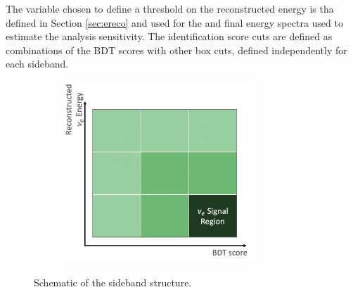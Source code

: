 The variable chosen to define a threshold on the reconstructed energy is tha defined in Section \ref{sec:ereco} and used for the \npsel and \zpsel final energy spectra used to estimate the analysis sensitivity.
The identification score cuts are defined as combinations of the BDT scores with other box cuts, defined independently for each sideband.

\begin{figure}[H]
    \begin{center}
    \begin{subfigure}{0.5\textwidth}
    \includegraphics[width=0.8\textwidth]{Sidebands/Figures/SidebandDiagram.png}
    \end{subfigure}
    \caption{\label{fig:sidebandsintro} Schematic of the sideband structure.}
    \end{center}
\end{figure}

